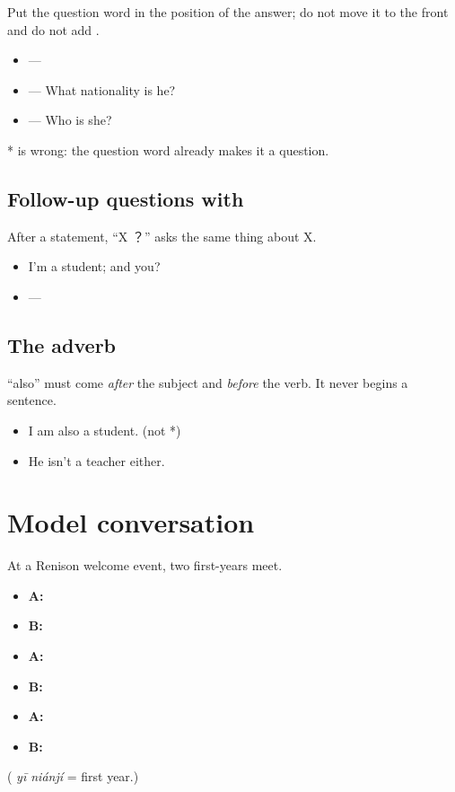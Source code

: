 Put the question word in the position of the answer; do not move it to the front and do
not add .
\begin{itemize}
  \item {}---
  \item {}--- What nationality is he?
  \item {}--- Who is she?
\end{itemize}

\begin{important}
* is wrong: the question word already makes it a question.
\end{important}

\subsection{Follow-up questions with }

After a statement, ``X ？'' asks the same thing about X.
\begin{itemize}
  \item {} I'm a student; and you?
  \item {}---
\end{itemize}

\subsection{The adverb }

 ``also'' must come \emph{after} the subject and \emph{before} the verb. It
never begins a sentence.
\begin{itemize}
  \item {} I am also a student. (not *)
  \item {} He isn't a teacher either.
\end{itemize}

\section{Model conversation}

At a Renison welcome event, two first-years meet.
\begin{itemize}
  \item \textbf{A:} 
  \item \textbf{B:} 
  \item \textbf{A:} 
  \item \textbf{B:} 
  \item \textbf{A:} 
  \item \textbf{B:} 
\end{itemize}
( \emph{yī niánjí} = first year.)


